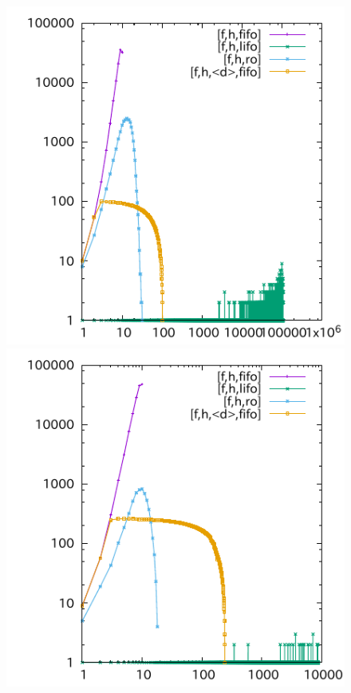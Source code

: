 \begin{figure}[tb]
\includegraphics{img/depth/pipesnt-pushstart/p06.pdf}
\includegraphics{img/depth/pipesworld-pushend/p06.pdf}

\end{figure}

